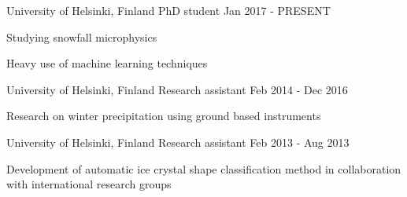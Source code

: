 

\begin{cventries}

  \cventry
    {University of Helsinki, Finland} %
    {PhD student} %
    {} %
    {Jan 2017 - PRESENT} %
    {
      \begin{cvitems} %
        \item {Studying snowfall microphysics}
        \item {Heavy use of machine learning techniques}
      \end{cvitems}
    }

  \cventry
    {University of Helsinki, Finland} %
    {Research assistant} %
    {} %
    {Feb 2014 - Dec 2016} %
    {
      \begin{cvitems} %
        \item {Research on winter precipitation using ground based instruments}
      \end{cvitems}
    }

  \cventry
    {University of Helsinki, Finland} %
    {Research assistant} %
    {} %
    {Feb 2013 - Aug 2013} %
    {
      \begin{cvitems} %
        \item {Development of automatic ice crystal shape classification method in collaboration with international research groups}
      \end{cvitems}
    }

\end{cventries}
